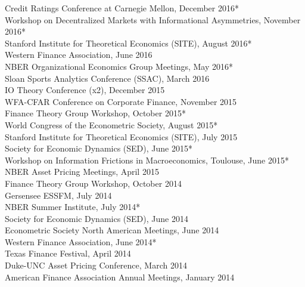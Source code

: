 \documentclass[margin,line,11pt]{resume}
\begin{document}
\begin{resume}
Credit Ratings Conference at Carnegie Mellon, December 2016* \\ %
Workshop on Decentralized Markets with Informational Asymmetries, November 2016* \\%
Stanford Institute for Theoretical Economics (SITE), August 2016* \\ %
Western Finance Association, June 2016 \\ %
NBER Organizational Economics Group Meetings, May 2016* \\ %
Sloan Sports Analytics Conference (SSAC), March 2016 \\ %
IO Theory Conference (x2), December 2015 \\ %
WFA-CFAR Conference on Corporate Finance, November 2015 \\ %
Finance Theory Group Workshop, October 2015* \\%
World Congress of the Econometric Society, August 2015* \\ %
Stanford Institute for Theoretical Economics (SITE), July 2015 \\ %
Society for Economic Dynamics (SED), June 2015*  \\ %
Workshop on Information Frictions in Macroeconomics, Toulouse, June 2015* \\ %
NBER Asset Pricing Meetings, April 2015 \\ %
Finance Theory Group Workshop, October 2014 \\ %
Gersensee ESSFM, July 2014  \\ %
NBER Summer Institute, July 2014* \\ %
Society for Economic Dynamics (SED), June 2014  \\ %
Econometric Society North American Meetings, June 2014  \\ %
Western Finance Association, June 2014* \\ %
Texas Finance Festival, April 2014 \\ %
Duke-UNC Asset Pricing Conference, March 2014 \\ %
American Finance Association Annual Meetings, January 2014 \\ %

\end{resume}
\end{document}
